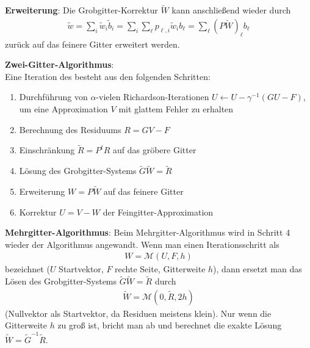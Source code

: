 \linie

\textbf{Erweiterung}:
Die Grobgitter-Korrektur $\widetilde{W}$ kann anschließend wieder durch
\begin{align*}
    \widetilde{w}
    = \sum_i \widetilde{w}_i \widetilde{b}_i
    = \sum_i \sum_\ell p_{\ell,i} \widetilde{w}_i b_\ell
    = \sum_\ell (P\widetilde{W})_\ell b_\ell
\end{align*}
zurück auf das feinere Gitter erweitert werden.

\linie

\textbf{Zwei-Gitter-Algorithmus}:\\
Eine Iteration des  besteht aus den folgenden Schritten:
\begin{enumerate}
    \item
    Durchführung von $\alpha$-vielen Richardson-Iterationen
    $U \leftarrow U - \gamma^{-1} (GU - F)$,
    um eine Approximation $V$ mit glattem Fehler zu erhalten

    \item
    Berechnung des Residuums $R = GV - F$

    \item
    Einschränkung $\widetilde{R} = P^t R$ auf das gröbere Gitter

    \item
    Lösung des Grobgitter-Systems $\widetilde{G} \widetilde{W} = \widetilde{R}$

    \item
    Erweiterung $W = P \widetilde{W}$ auf das feinere Gitter

    \item
    Korrektur $U = V - W$ der Feingitter-Approximation
\end{enumerate}

\linie

\textbf{Mehrgitter-Algorithmus}:
Beim Mehrgitter-Algorithmus wird in Schritt 4 wieder der Algorithmus angewandt.
Wenn man einen Iterationsschritt als
\begin{align*}
    W = \mathcal{M}(U, F, h)
\end{align*}
bezeichnet ($U$ Startvektor, $F$ rechte Seite, Gitterweite $h$),
dann ersetzt man das Lösen des Grobgitter-Systems $\widetilde{G} \widetilde{W} = \widetilde{R}$
durch
\begin{align*}
    \widetilde{W} = \mathcal{M}(0, \widetilde{R}, 2h)
\end{align*}
(Nullvektor als Startvektor, da Residuen meistens klein).
Nur wenn die Gitterweite $h$ zu groß ist, bricht man ab und berechnet die exakte Lösung
$\widetilde{W} = \widetilde{G}^{-1} \widetilde{R}$.

